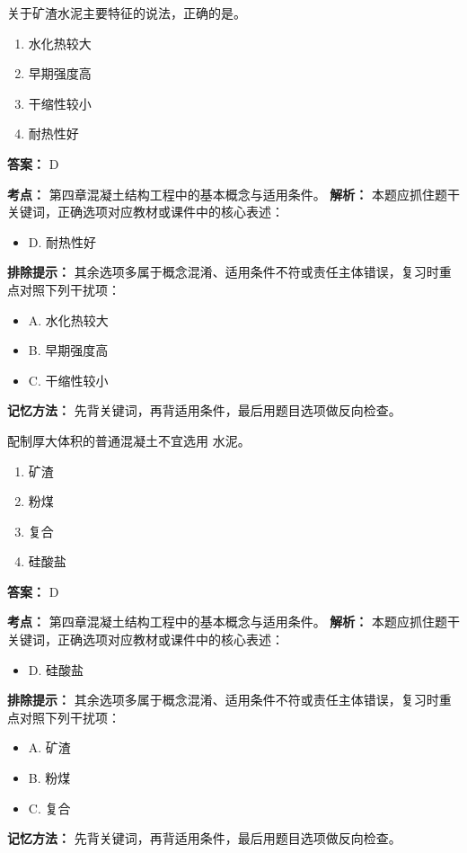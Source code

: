 \documentclass[UTF8,fontset=fandol,11pt]{ctexart}
\begin{document}
\begin{quizbox}[title={第 48 题}]
关于矿渣水泥主要特征的说法，正确的是。\\
\begin{enumerate}[label=\Alph*.]
\item 水化热较大
\item 早期强度高
\item 干缩性较小
\item 耐热性好
\end{enumerate}
\textbf{答案：} D
\vspace{0.25em}
\begin{answerbox}[title={考点解析}]
\textbf{考点：} 第四章混凝土结构工程中的基本概念与适用条件。
\textbf{解析：} 本题应抓住题干关键词，正确选项对应教材或课件中的核心表述：
\begin{itemize}
\item D. 耐热性好
\end{itemize}
\textbf{排除提示：} 其余选项多属于概念混淆、适用条件不符或责任主体错误，复习时重点对照下列干扰项：
\begin{itemize}
\item A. 水化热较大
\item B. 早期强度高
\item C. 干缩性较小
\end{itemize}
\textbf{记忆方法：} 先背关键词，再背适用条件，最后用题目选项做反向检查。
\end{answerbox}
\end{quizbox}

\begin{quizbox}[title={第 49 题}]
配制厚大体积的普通混凝土不宜选用 水泥。\\
\begin{enumerate}[label=\Alph*.]
\item 矿渣
\item 粉煤
\item 复合
\item 硅酸盐
\end{enumerate}
\textbf{答案：} D
\vspace{0.25em}
\begin{answerbox}[title={考点解析}]
\textbf{考点：} 第四章混凝土结构工程中的基本概念与适用条件。
\textbf{解析：} 本题应抓住题干关键词，正确选项对应教材或课件中的核心表述：
\begin{itemize}
\item D. 硅酸盐
\end{itemize}
\textbf{排除提示：} 其余选项多属于概念混淆、适用条件不符或责任主体错误，复习时重点对照下列干扰项：
\begin{itemize}
\item A. 矿渣
\item B. 粉煤
\item C. 复合
\end{itemize}
\textbf{记忆方法：} 先背关键词，再背适用条件，最后用题目选项做反向检查。
\end{answerbox}
\end{quizbox}
\end{document}
